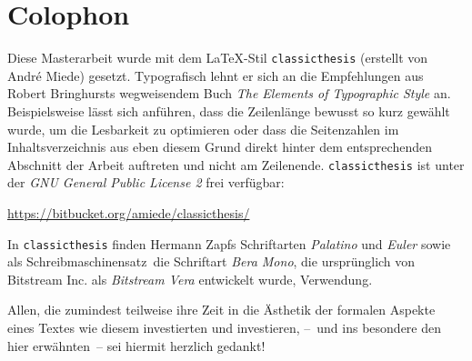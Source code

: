 \pagestyle{empty}

\hfill
\vfill

\section*{Colophon}
Diese Masterarbeit wurde mit dem \LaTeX-Stil \texttt{classicthesis} (erstellt von Andr\'e Miede) gesetzt. 
Typografisch lehnt er sich an die Empfehlungen aus Robert Bringhursts wegweisendem Buch 
\emph{The Elements of Typographic Style} \cite{Bringhurst2002} an.
Beispielsweise lässt sich anführen, dass die Zeilenlänge bewusst so kurz gewählt wurde, um die Lesbarkeit zu optimieren oder dass die 
Seitenzahlen im Inhaltsverzeichnis aus eben diesem Grund direkt hinter dem entsprechenden Abschnitt der Arbeit auftreten und nicht am Zeilenende.
\texttt{classicthesis} ist unter der \emph{GNU General Public License 2} frei verfügbar:
\begin{center}
\url{https://bitbucket.org/amiede/classicthesis/}
\end{center}
 
\bigskip


In \texttt{classicthesis} finden Hermann Zapfs Schriftarten \emph{Palatino} und \emph{Euler}
sowie als \glqq Schreibmaschinensatz\grqq\ die Schriftart \emph{Bera Mono}, 
die ursprünglich von Bitstream Inc. als \emph{Bitstream Vera} entwickelt wurde, Verwendung.

Allen, die zumindest teilweise ihre Zeit in die Ästhetik der formalen Aspekte eines Textes wie diesem investierten und investieren, --~und ins besondere den hier erwähnten~-- sei hiermit herzlich gedankt!



